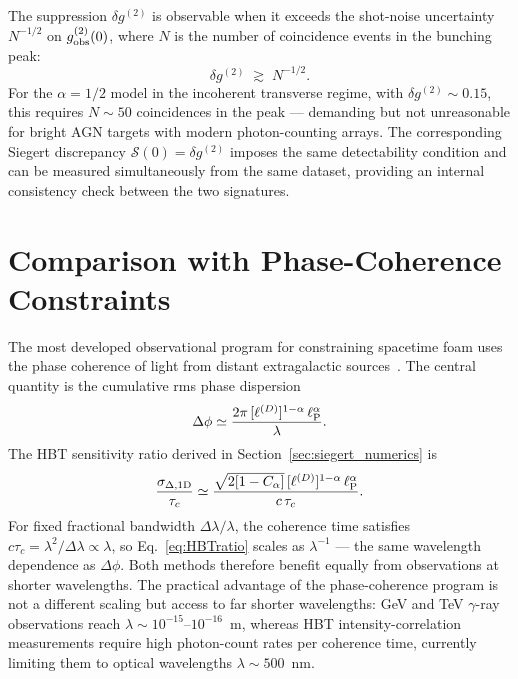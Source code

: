 \documentclass[aps,prd,onecolumn,amsmath,amssymb]{revtex4-2}
\begin{document}
The suppression $\delta g^{(2)}$ is observable when it exceeds the shot-noise
uncertainty $N^{-1/2}$ on $g^{(2)}_{\rm obs}(0)$, where $N$ is the number of
coincidence events in the bunching peak:
\begin{equation}
  \delta g^{(2)}
  \;\gtrsim\; N^{-1/2}.
  \label{eq:detectability}
\end{equation}
For the $\alpha = 1/2$ model in the incoherent transverse regime, with
$\delta g^{(2)} \sim 0.15$, this requires $N \sim 50$ coincidences in the
peak — demanding but not unreasonable for bright AGN targets with modern
photon-counting arrays.
The corresponding Siegert discrepancy $\mathcal{S}(0) = \delta g^{(2)}$
imposes the same detectability condition and can be measured simultaneously
from the same dataset, providing an internal consistency check between the
two signatures.

\section{Comparison with Phase-Coherence Constraints}
\label{sec:comparison}

The most developed observational program for constraining spacetime foam
uses the phase coherence of light from distant extragalactic
sources~\cite{NgPerlman2022,Christiansen2011,Perlman2015,LieuHillman2003}.
The central quantity is the cumulative rms phase dispersion
\begin{equation}
  \Delta\phi \simeq \frac{2\pi\,[\ell^{(D)}]^{1-\alpha}\,\ell_{\rm P}^{\alpha}}{\lambda}.
  \label{eq:phaseDisp}
\end{equation}
The HBT sensitivity ratio derived in Section~\ref{sec:siegert_numerics} is
\begin{equation}
  \frac{\sigma_{\Delta,{\rm 1D}}}{\tau_c}
  \simeq \frac{\sqrt{2[1-C_\alpha]}\,[\ell^{(D)}]^{1-\alpha}\,\ell_{\rm P}^{\alpha}}
              {c\,\tau_c}.
  \label{eq:HBTratio}
\end{equation}
For fixed fractional bandwidth $\Delta\lambda/\lambda$, the coherence time
satisfies $c\tau_c = \lambda^2/\Delta\lambda \propto \lambda$, so
Eq.~\eqref{eq:HBTratio} scales as $\lambda^{-1}$ — the same wavelength
dependence as $\Delta\phi$.
Both methods therefore benefit equally from observations at shorter wavelengths.
The practical advantage of the phase-coherence program is not a different
scaling but access to far shorter wavelengths: GeV and TeV $\gamma$-ray
observations reach $\lambda \sim 10^{-15}$--$10^{-16}$~m, whereas HBT
intensity-correlation measurements require high photon-count rates per
coherence time, currently limiting them to optical wavelengths
$\lambda \sim 500$~nm.
\end{document}
